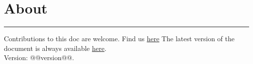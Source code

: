 \section{About}
\hrule

\medskip

Contributions to this doc are welcome. Find us \href{https://github.com/robert-will-brown/video-streaming-cheatsheet}{here}
The latest version of the document is always available \href{https://bit.ly/3p1Omqh}{here}.
~\\

Version: @@version@@.
